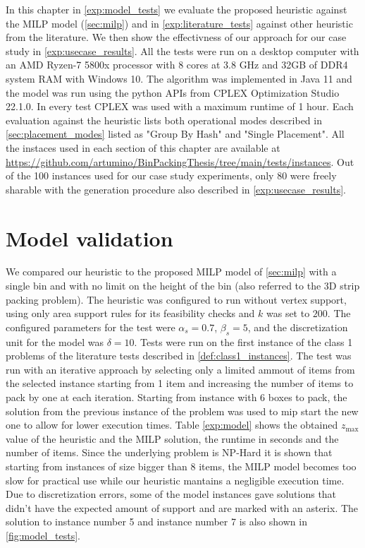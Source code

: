 In this chapter in \cref{exp:model_tests} we evaluate the proposed heuristic against the MILP model (\ref{sec:milp}) and in \cref{exp:literature_tests} against other heuristic from the literature. We then show the effectivness of our approach for our case study in \cref{exp:usecase_results}.
All the tests were run on a desktop computer with an AMD Ryzen-7 5800x processor with 8 cores at 3.8 GHz and 32GB of DDR4 system RAM with Windows 10. The algorithm was implemented in Java 11 and the model was run using the python APIs from CPLEX Optimization Studio 22.1.0.
In every test CPLEX was used with a maximum runtime of 1 hour.
Each evaluation against the heuristic lists both operational modes described in \cref{sec:placement_modes} listed as "Group By Hash" and "Single Placement".
All the instaces used in each section of this chapter are available at \url{https://github.com/artumino/BinPackingThesis/tree/main/tests/instances}.
Out of the 100 instances used for our case study experiments, only 80 were freely sharable with the generation procedure also described in \cref{exp:usecase_results}.

\section{Model validation}
We compared our heuristic to the proposed MILP model of \cref{sec:milp} with a single bin and with no limit on the height of the bin (also referred to the 3D strip packing problem).
The heuristic was configured to run without vertex support, using only area support rules for its feasibility checks and $k$ was set to $200$.
The configured parameters for the test were $\alpha_s = 0.7$, $\beta_s = 5$, and the discretization unit for the model was $\delta = 10$. 
Tests were run on the first instance of the class 1 problems of the literature tests described in \cref{def:class1_instances}.
The test was run with an iterative approach by selecting only a limited ammout of items from the selected instance starting from 1 item and increasing the number of items to pack by one at each iteration.
Starting from instance with 6 boxes to pack, the solution from the previous instance of the problem was used to mip start the new one to allow for lower execution times.
Table \ref{exp:model} shows the obtained $z_{\text{max}}$ value of the heuristic and the MILP solution, the runtime in seconds and the number of items.
Since the underlying problem is NP-Hard it is shown that starting from instances of size bigger than 8 items, the MILP model becomes too slow for practical use while our heuristic mantains a negligible execution time.
Due to discretization errors, some of the model instances gave solutions that didn't have the expected amount of support and are marked with an asterix.
The solution to instance number 5 and instance number 7 is also shown in \cref{fig:model_tests}.
\label{exp:model_tests}



